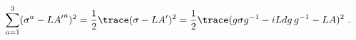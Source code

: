 \begin{equation}
  \sum\limits_{a=1}^3 (\sigma^a -L {A'}^a)^2 
  = \frac12 \trace ( \sigma -L A' )^2 
  = \frac12 \trace (g \sigma g^{-1} -iL dg \,g^{-1} -L A)^2~.
\end{equation}

